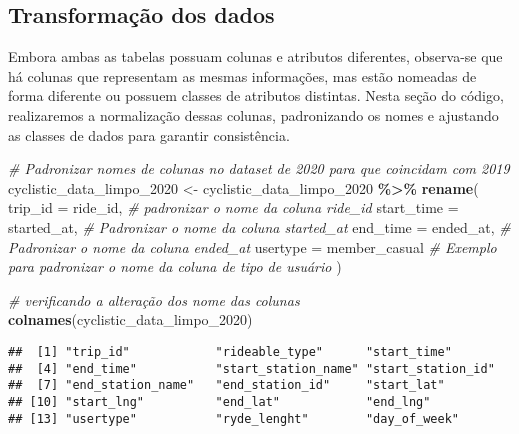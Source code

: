\documentclass[
]{article}
\newenvironment{Shaded}{\begin{snugshade}}{\end{snugshade}}
\newcommand{\AttributeTok}[1]{\textcolor[rgb]{0.13,0.29,0.53}{#1}}
\newcommand{\CommentTok}[1]{\textcolor[rgb]{0.56,0.35,0.01}{\textit{#1}}}
\newcommand{\FunctionTok}[1]{\textcolor[rgb]{0.13,0.29,0.53}{\textbf{#1}}}
\newcommand{\NormalTok}[1]{#1}
\newcommand{\OtherTok}[1]{\textcolor[rgb]{0.56,0.35,0.01}{#1}}
\newcommand{\SpecialCharTok}[1]{\textcolor[rgb]{0.81,0.36,0.00}{\textbf{#1}}}
\begin{document}
\subsection{Transformação dos
dados}\label{transformauxe7uxe3o-dos-dados}

Embora ambas as tabelas possuam colunas e atributos diferentes,
observa-se que há colunas que representam as mesmas informações, mas
estão nomeadas de forma diferente ou possuem classes de atributos
distintas. Nesta seção do código, realizaremos a normalização dessas
colunas, padronizando os nomes e ajustando as classes de dados para
garantir consistência.

\begin{Shaded}
\begin{Highlighting}[]
\CommentTok{\# Padronizar nomes de colunas no dataset de 2020 para que coincidam com 2019}
\NormalTok{cyclistic\_data\_limpo\_2020 }\OtherTok{\textless{}{-}}\NormalTok{ cyclistic\_data\_limpo\_2020 }\SpecialCharTok{\%\textgreater{}\%}
  \FunctionTok{rename}\NormalTok{(}
    \AttributeTok{trip\_id =}\NormalTok{ ride\_id,        }\CommentTok{\# padronizar o nome da coluna ride\_id}
    \AttributeTok{start\_time =}\NormalTok{ started\_at,          }\CommentTok{\# Padronizar o nome da coluna \textquotesingle{}started\_at\textquotesingle{}}
    \AttributeTok{end\_time =}\NormalTok{ ended\_at,              }\CommentTok{\# Padronizar o nome da coluna \textquotesingle{}ended\_at\textquotesingle{}}
    \AttributeTok{usertype =}\NormalTok{ member\_casual       }\CommentTok{\# Exemplo para padronizar o nome da coluna de tipo de usuário}
\NormalTok{  )}
\end{Highlighting}
\end{Shaded}

\begin{Shaded}
\begin{Highlighting}[]
\CommentTok{\# verificando a alteração dos nome das colunas}
\FunctionTok{colnames}\NormalTok{(cyclistic\_data\_limpo\_2020)}
\end{Highlighting}
\end{Shaded}

\begin{verbatim}
##  [1] "trip_id"            "rideable_type"      "start_time"        
##  [4] "end_time"           "start_station_name" "start_station_id"  
##  [7] "end_station_name"   "end_station_id"     "start_lat"         
## [10] "start_lng"          "end_lat"            "end_lng"           
## [13] "usertype"           "ryde_lenght"        "day_of_week"
\end{verbatim}
\end{document}
